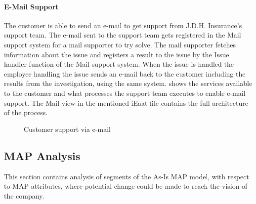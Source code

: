 \paragraph{E-Mail Support}
\label{sec:mail_support}
The customer is able to send an e-mail to get support from J.D.H. Insurance's support team. The e-mail sent to the support team gets registered in the Mail support system for a mail supporter to try solve. The mail supporter fetches information about the issue and registers a result to the issue by the Issue handler function of the Mail support system. When the issue is handled the employee handling the issue sends an e-mail back to the customer including the results from the investigation, using the same system.  shows the services available to the customer and what processes the support team executes to enable e-mail support. The Mail view in the mentioned iEaat file contains the full architecture of the process. 
\begin{center}
	\begin{figure}[H]
		\centering
		\setlength\fboxsep{7pt}
		\setlength\fboxrule{0.5pt}
		\caption{Customer support via e-mail}
		\label{fig:map_mail}
	\end{figure}
\end{center}
%

\subsection{MAP Analysis}
\label{sec:map_analysis}
This section contains analysis of segments of the As-Is MAP model, with respect to MAP attributes, where potential change could be made to reach the vision of the company.

